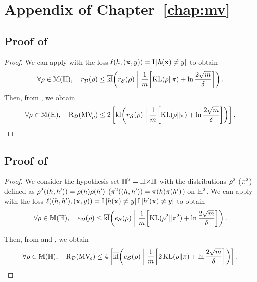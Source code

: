 \chapter{Appendix of Chapter~\ref{chap:mv}}
\label{ap:mv}

\begin{noaddcontents}
\section{Proof of~}
\label{ap:mv:proof-pb-2gibbs}

\theorempbtwogibbs*
\begin{proof}
We can apply  with the loss $\loss(\h, (\x,\y)) = \indic\LB \h(\x)\ne \y\RB$ to obtain 
\begin{align*}
    \forall\Q\in\M(\H),\quad r_{\D}(\Q) \le \klmax\!\LP r_{\dS}(\Q) \;\middle|\; \frac{1}{\m}\!\LB\KL(\Q\|\P)+\ln\frac{2\sqrt{\m}}{\delta}\RB\RP.
\end{align*}
Then, from , we obtain 
\begin{align*}
\forall\Q\in\M(\H),\quad \Risk_{\D}(\MVQ) \le 2\LB \klmax\!\LP r_{\dS}(\Q) \;\middle|\; \frac{1}{\m}\!\LB\KL(\Q\|\P)+\ln\frac{2\sqrt{\m}}{\delta}\RB\RP \RB.
\end{align*}
\end{proof}

\section{Proof of~}
\label{ap:mv:proof-pb-joint-error}

\theorempbjoint*
\begin{proof}
We consider the hypothesis set $\H^2 = \H{\times}\H$ with the distributions $\Q^2$ (\resp $\P^2$) defined as $\Q^2((\h, \h'))=\Q(\h)\Q(\h')$ (\resp $\P^2((\h, \h'))=\P(\h)\P(\h')$) on $\H^2$.
We can apply  with the loss $\loss((\h, \h'), (\x,\y)) = \indic\LB \h(\x)\ne \y\RB\indic\LB \h'(\x)\ne \y \RB$ to obtain 
\begin{align*}
\forall\Q\in\M(\H),\quad e_{\D}(\Q) \le \klmax\!\LP e_{\dS}(\Q) \;\middle|\; \frac{1}{\m}\!\LB \KL(\Q^2\|\P^2)+\ln\frac{2\sqrt{\m}}{\delta}\RB\RP.
\end{align*}


Then, from  and , we obtain 
\begin{align*}
\forall\Q\in\M(\H),\quad \Risk_{\D}(\MVQ) \le 4\LB \klmax\!\LP e_{\dS}(\Q) \;\middle|\; \frac{1}{\m}\!\LB 2\KL(\Q\|\P)+\ln\frac{2\sqrt{\m}}{\delta}\RB\RP \RB.
\end{align*}
\end{proof}


\end{noaddcontents}
